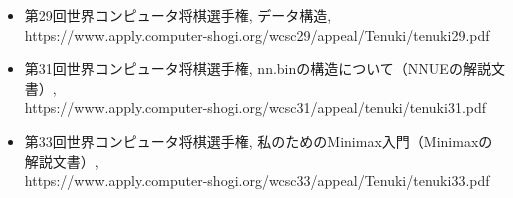 \documentclass[11pt,a4paper]{ltjsarticle}
\begin{document}
\begin{itemize}
  \item 第29回世界コンピュータ将棋選手権, データ構造, \\ https://www.apply.computer-shogi.org/wcsc29/appeal/Tenuki/tenuki29.pdf
  \item 第31回世界コンピュータ将棋選手権, nn.binの構造について（NNUEの解説文書）, \\ https://www.apply.computer-shogi.org/wcsc31/appeal/tenuki/tenuki31.pdf
  \item 第33回世界コンピュータ将棋選手権, 私のためのMinimax入門（Minimaxの解説文書）, \\ https://www.apply.computer-shogi.org/wcsc33/appeal/Tenuki/tenuki33.pdf
\end{itemize}
\end{document}
